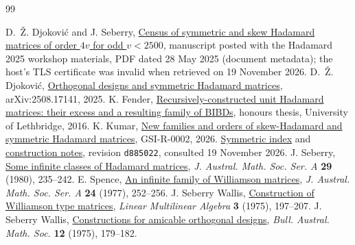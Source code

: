 \documentclass[11pt,letterpaper]{article}
\newcommand{\doi}[2]{\href{https://doi.org/#1}{#2}}
\begin{document}
\newpage
\small
\begin{thebibliography}{99}
\raggedright
{} D.~\v{Z}. Djokovi\'c and J. Seberry, \href{https://us.ticmeet.com/assets/archivos/d6f1d9b8-d39f-4888-925a-7eb81c4905cc/jenni-paper.pdf}{Census of symmetric and skew Hadamard matrices of order \(4v\) for odd \(v<2500\)}, manuscript posted with the Hadamard 2025 workshop materials, PDF dated 28 May 2025 (document metadata); the host's TLS certificate was invalid when retrieved on 19 November 2026.
 D.~\v{Z}. Djokovi\'c, \href{https://arxiv.org/abs/2508.17141}{Orthogonal designs and symmetric Hadamard matrices}, arXiv:2508.17141, 2025.
 K. Fender, \href{https://www.ulethbridge.ca/sites/default/files/docs/Spring\%202016\%20-\%20Kai\%20Fender\%20-\%20Honours\%20Thesis.pdf}{Recursively-constructed unit Hadamard matrices: their excess and a resulting family of BIBDs}, honours thesis, University of Lethbridge, 2016.
 K. Kumar, \href{https://generalised.si/research/skew-symmetric-hadamard}{New families and orders of skew-Hadamard and symmetric Hadamard matrices}, GSI-R-0002, 2026. \href{https://github.com/vatskishan03/Hadamard/blob/d885022144ba6bf4efa8315e14871a3736947527/symmetric/README.md}{Symmetric index} and \href{https://github.com/vatskishan03/Hadamard/blob/d885022144ba6bf4efa8315e14871a3736947527/search/NOTES.md}{construction notes}, revision \texttt{d885022}, consulted 19 November 2026.
 J. Seberry, \doi{10.1017/S1446788700021212}{Some infinite classes of Hadamard matrices}, \emph{J. Austral. Math. Soc. Ser. A} \textbf{29} (1980), 235--242.
 E. Spence, \doi{10.1017/S1446788700020255}{An infinite family of Williamson matrices}, \emph{J. Austral. Math. Soc. Ser. A} \textbf{24} (1977), 252--256.
 J. Seberry Wallis, \doi{10.1080/03081087508817111}{Construction of Williamson type matrices}, \emph{Linear Multilinear Algebra} \textbf{3} (1975), 197--207.
 J. Seberry Wallis, \doi{10.1017/S0004972700023807}{Constructions for amicable orthogonal designs}, \emph{Bull. Austral. Math. Soc.} \textbf{12} (1975), 179--182.
\end{thebibliography}
\end{document}
